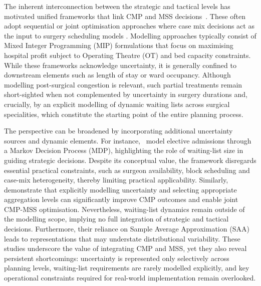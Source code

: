 The inherent interconnection between the strategic and tactical levels has motivated unified frameworks that link CMP and MSS decisions~\citep{Melo2025}. 
These often adopt sequential or joint optimisation approaches where case mix decisions act as the input to surgery scheduling models \citep{Ma2013Mult, Fugener2015}.
Modelling approaches typically consist of Mixed Integer Programming (MIP) formulations that focus on maximising hospital profit subject to Operating Theatre (OT) and bed capacity constraints.
While these frameworks acknowledge uncertainty, it is generally confined to downstream elements such as length of stay or ward occupancy.
Although modelling post-surgical congestion is relevant, such partial treatments remain short-sighted when not complemented by uncertainty in surgery durations and, crucially, by an explicit modelling of dynamic waiting lists across surgical specialities, which constitute the starting point of the entire planning process.

The perspective can be broadened by incorporating additional uncertainty sources and dynamic elements.
For instance,~\citet{Liu2019} model elective admissions through a Markov Decision Process (MDP), highlighting the role of waiting-list size in guiding strategic decisions.
Despite its conceptual value, the framework disregards essential practical constraints, such as surgeon availability, block scheduling and case-mix heterogeneity, thereby limiting practical applicability.
Similarly,~\citet{Mcrae2020} demonstrate that explicitly modelling uncertainty and selecting appropriate aggregation levels can significantly improve CMP outcomes and enable joint CMP-MSS optimisation.
Nevertheless, waiting-list dynamics remain outside of the modelling scope, implying no full integration of strategic and tactical decisions. 
Furthermore, their reliance on Sample Average Approximation (SAA) leads to representations that may understate distributional variability. 
These studies underscore the value of integrating CMP and MSS, yet they also reveal persistent shortcomings: uncertainty is represented only selectively across planning levels, waiting-list requirements are rarely modelled explicitly, and key operational constraints required for real-world implementation remain overlooked.

